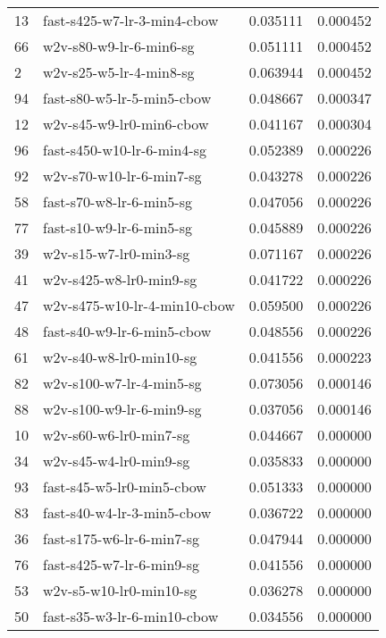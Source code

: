 {\begin{tabular}{llrr}
13 &   fast-s425-w7-lr-3-min4-cbow &  0.035111 &  0.000452 \\
66 &       w2v-s80-w9-lr-6-min6-sg &  0.051111 &  0.000452 \\
2  &       w2v-s25-w5-lr-4-min8-sg &  0.063944 &  0.000452 \\
94 &    fast-s80-w5-lr-5-min5-cbow &  0.048667 &  0.000347 \\
12 &      w2v-s45-w9-lr0-min6-cbow &  0.041167 &  0.000304 \\
96 &    fast-s450-w10-lr-6-min4-sg &  0.052389 &  0.000226 \\
92 &      w2v-s70-w10-lr-6-min7-sg &  0.043278 &  0.000226 \\
58 &      fast-s70-w8-lr-6-min5-sg &  0.047056 &  0.000226 \\
77 &      fast-s10-w9-lr-6-min5-sg &  0.045889 &  0.000226 \\
39 &        w2v-s15-w7-lr0-min3-sg &  0.071167 &  0.000226 \\
41 &       w2v-s425-w8-lr0-min9-sg &  0.041722 &  0.000226 \\
47 &  w2v-s475-w10-lr-4-min10-cbow &  0.059500 &  0.000226 \\
48 &    fast-s40-w9-lr-6-min5-cbow &  0.048556 &  0.000226 \\
61 &       w2v-s40-w8-lr0-min10-sg &  0.041556 &  0.000223 \\
82 &      w2v-s100-w7-lr-4-min5-sg &  0.073056 &  0.000146 \\
88 &      w2v-s100-w9-lr-6-min9-sg &  0.037056 &  0.000146 \\
10 &        w2v-s60-w6-lr0-min7-sg &  0.044667 &  0.000000 \\
34 &        w2v-s45-w4-lr0-min9-sg &  0.035833 &  0.000000 \\
93 &     fast-s45-w5-lr0-min5-cbow &  0.051333 &  0.000000 \\
83 &    fast-s40-w4-lr-3-min5-cbow &  0.036722 &  0.000000 \\
36 &     fast-s175-w6-lr-6-min7-sg &  0.047944 &  0.000000 \\
76 &     fast-s425-w7-lr-6-min9-sg &  0.041556 &  0.000000 \\
53 &       w2v-s5-w10-lr0-min10-sg &  0.036278 &  0.000000 \\
50 &   fast-s35-w3-lr-6-min10-cbow &  0.034556 &  0.000000 \\
\bottomrule
\end{tabular}
}
